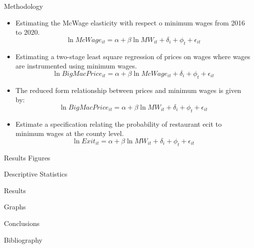 \documentclass[12pt]{beamer}
\begin{document}
\begin{frame}[allowframebreaks]{Methodology}
	\begin{itemize}
		\item Estimating the McWage elasticity with respect o minimum wages from 2016 to 2020.
		      \begin{equation}
			      \ln{McWage_{it}} = \alpha + \beta \ln{MW_{it}} + \delta_{i} + \phi_{t} + \epsilon_{it}
		      \end{equation}
		\item Estimating a two-stage least square regression of prices on wages where wages are instrumented using minimum wages.
		      \begin{equation}
			      \ln{BigMacPrice_{it}} = \alpha + \beta \ln{McWage_{it}} + \delta_{i} + \phi_{t} + \epsilon_{it}
		      \end{equation}
		\item The reduced form relationship between prices and minimum wages is given by:
		      \begin{equation}
			      \ln{BigMacPrice_{it}} = \alpha + \beta \ln{MW_{it}} + \delta_{i} + \phi_{t} + \epsilon_{it}
		      \end{equation}
		\item Estimate a specification relating the probability of restaurant ecit to minimum wages at the county level.
		      \begin{equation}
			      \ln{Exit_{it}} = \alpha + \beta \ln{MW_{it}} + \delta_{i} + \phi_{t} + \epsilon_{it}
		      \end{equation}
	\end{itemize}

\end{frame}

\begin{frame}[allowframebreaks]{Results Figures}

\end{frame}

\begin{frame}[allowframebreaks]{Descriptive Statistics}

\end{frame}

\begin{frame}[allowframebreaks]{Results}

\end{frame}

\begin{frame}[allowframebreaks]{Graphs}

\end{frame}

\begin{frame}[allowframebreaks]{Conclusions}

\end{frame}
\begin{frame}[allowframebreaks]{Bibliography}
	\printbibliography
\end{frame}
\end{document}
